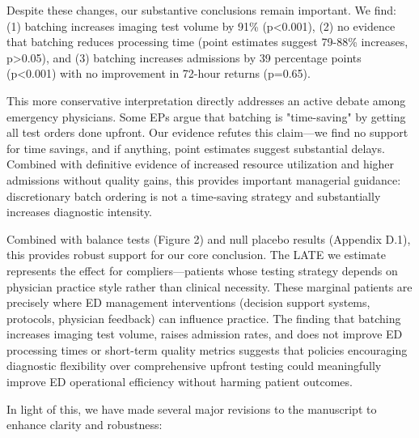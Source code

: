 \documentclass[11pt]{article}
\newcommand{\1}{\hbox{\rm 1\kern-.35em 1}}
\begin{document}
Despite these changes, our substantive conclusions remain important. We find: (1) batching increases imaging test volume by 91\% (p<0.001), (2) no evidence that batching reduces processing time (point estimates suggest 79-88\% increases, p>0.05), and (3) batching increases admissions by 39 percentage points (p<0.001) with no improvement in 72-hour returns (p=0.65).

This more conservative interpretation directly addresses an active debate among emergency physicians. Some EPs argue that batching is "time-saving" by getting all test orders done upfront. Our evidence refutes this claim—we find no support for time savings, and if anything, point estimates suggest substantial delays. Combined with definitive evidence of increased resource utilization and higher admissions without quality gains, this provides important managerial guidance: discretionary batch ordering is not a time-saving strategy and substantially increases diagnostic intensity.

Combined with balance tests (Figure 2) and null placebo results (Appendix D.1), this provides robust support for our core conclusion. The LATE we estimate represents the effect for compliers—patients whose testing strategy depends on physician practice style rather than clinical necessity. These marginal patients are precisely where ED management interventions (decision support systems, protocols, physician feedback) can influence practice. The finding that batching increases imaging test volume, raises admission rates, and does not improve ED processing times or short-term quality metrics suggests that policies encouraging diagnostic flexibility over comprehensive upfront testing could meaningfully improve ED operational efficiency without harming patient outcomes.

In light of this, we have made several major revisions to the manuscript to enhance clarity and robustness:
\end{document}
